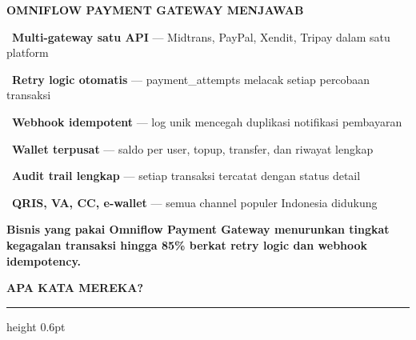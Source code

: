 \documentclass[a4paper]{article}
\newcommand{\sectiontitle}[1]{%
    \vspace{10pt}%
    {\fontsize{13}{16}\selectfont\bfseries\color{BlueDark} #1}\par\vspace{3pt}%
    {\color{BluePrimary}\hrule height 0.6pt}\par\vspace{8pt}%
}
\begin{document}
\begin{minipage}[t]{0.485\textwidth}
    \colorbox{GreenPrimary}{%
        \begin{minipage}{\dimexpr\textwidth-2\fboxsep\relax}
            {\fontsize{10}{13}\selectfont\bfseries\color{White} OMNIFLOW PAYMENT GATEWAY MENJAWAB}
        \end{minipage}}\par
    \vspace{4pt}

    {\fontsize{9.5}{13}\selectfont\color{TextDark}%
    \textbullet\ \textbf{Multi-gateway satu API} --- Midtrans, PayPal, Xendit, Tripay dalam satu platform\par\vspace{4pt}%
    \textbullet\ \textbf{Retry logic otomatis} --- payment\_attempts melacak setiap percobaan transaksi\par\vspace{4pt}%
    \textbullet\ \textbf{Webhook idempotent} --- log unik mencegah duplikasi notifikasi pembayaran\par\vspace{4pt}%
    \textbullet\ \textbf{Wallet terpusat} --- saldo per user, topup, transfer, dan riwayat lengkap\par\vspace{4pt}%
    \textbullet\ \textbf{Audit trail lengkap} --- setiap transaksi tercatat dengan status detail\par\vspace{4pt}%
    \textbullet\ \textbf{QRIS, VA, CC, e-wallet} --- semua channel populer Indonesia didukung}%
\end{minipage}

\vspace{8pt}

{\setlength{\fboxsep}{7pt}\setlength{\fboxrule}{0pt}%
\noindent\colorbox{GreenPrimary}{%
    \begin{minipage}{\dimexpr\textwidth-2\fboxsep\relax}
        \centering
        {\fontsize{9.5}{12}\selectfont\bfseries\color{White}
        Bisnis yang pakai Omniflow Payment Gateway menurunkan \textbf{tingkat kegagalan transaksi hingga 85\%} berkat retry logic dan webhook idempotency.}
    \end{minipage}}}

\vspace{8pt}
\sectiontitle{APA KATA MEREKA?}
\end{document}

